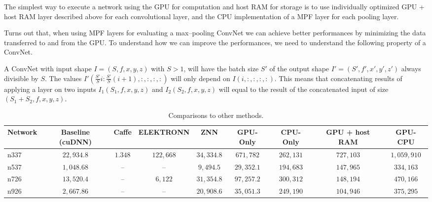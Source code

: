 \documentclass[conference]{./IEEEtran}
\begin{document}
  The simplest way to execute a network using the GPU for computation
  and host RAM for storage is to use individually optimized GPU + host
  RAM layer described above for each convolutional layer, and the CPU
  implementation of a MPF layer for each pooling layer.

  Turns out that, when using MPF layers for evaluating a max--pooling
  ConvNet we can achieve better performances by minimizing the data
  transferred to and from the GPU.  To understand how we can improve
  the performances, we need to understand the following property of a
  ConvNet.

  A ConvNet with input shape $I = (S,f,x,y,z)$ with $S > 1$, will have
  the batch size $S'$ of the output shape $I' = (S',f',x',y',z')$
  always divisible by $S$.  The values $I'(\frac{S'}{S} i :
  \frac{S'}{S} (i+1),:,:,:,:)$ will only depend on $I(i,:,:,:,:)$.
  This means that concatenating results of applying a layer on two
  inputs $I_1(S_1,f,x,y,z)$ and $I_2(S_2,f,x,y,z)$ will equal to the
  result of the concatenated input of size $(S_1+S_2,f,x,y,z)$.

  \begin{table}[!htbp]
    { \footnotesize
    \centering
    \begin{tabular}{l|cccccccc}
      \toprule
      Network  & Baseline (cuDNN)  & Caffe    & ELEKTRONN   & ZNN         & GPU-Only    & CPU-Only    & GPU + host RAM & GPU-CPU   \\
      \midrule
      n337     & $22,934.8$        & $1.348$  & $122,668$   & $34,334.8$  & $671,782$   & $262,131$   & $727,103$      & $1,059,910$ \\
      n537     & $1,048.68$        & --       & --          & $9,494.5$   & $29,352.1$  & $194,683$   & $147,965$      & $334,163$ \\
      n726     & $13,520.4$        & --       & $6,122$     & $31,354.8$  & $97,257.2$  & $300,312$   & $148,194$      & $470,166$ \\
      n926     & $2,667.86$        & --       & --          & $20,908.6$  & $35,051.3$  & $249,190$   & $104,946$      & $375,295$ \\
      \bottomrule
    \end{tabular}
    \caption{Comparisons to other methods.}
    \label{table:comparisons_to_others}
  }
  \end{table}
\end{document}

